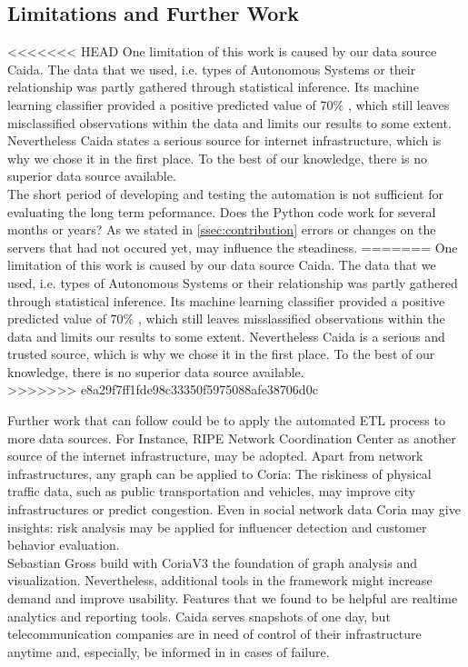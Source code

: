 \documentclass[conference, 11pt]{IEEEtran}
\begin{document}
\subsection{Limitations and Further Work}
<<<<<<< HEAD
One limitation of this work is caused by our data source Caida. The data that we used, i.e. types of Autonomous Systems or their relationship was partly gathered through statistical inference. Its machine learning classifier provided a positive predicted value of 70\% \cite{Classification}, which still leaves misclassified observations within the data and limits our results to some extent. Nevertheless Caida states a serious source for internet infrastructure, which is why we chose it in the first place. To the best of our knowledge, there is no superior data source available.  \\ 
The short period of developing and testing the automation is not sufficient for evaluating the long term peformance. Does the Python code work for several months or years? As we stated in \ref{ssec:contribution} errors or changes on the servers that had not occured yet, may influence the steadiness.
=======
One limitation of this work is caused by our data source Caida. The data that we used, i.e. types of Autonomous Systems or their relationship was partly gathered through statistical inference. Its machine learning classifier provided a positive predicted value of 70\% \cite{Classification} \cite{dataInference}, which still leaves misslassified observations within the data and limits our results to some extent. Nevertheless Caida is a serious and trusted source, which is why we chose it in the first place. To the best of our knowledge, there is no superior data source available.  \\ 
>>>>>>> e8a29f7ff1fde98c33350f5975088afe38706d0c

Further work that can follow could be to apply the automated ETL process to more data sources. For Instance, RIPE Network Coordination Center \cite{RipeNCC} as another source of the internet infrastructure, may be adopted. Apart from network infrastructures, any graph can be applied to Coria: The riskiness of physical traffic data, such as public transportation and vehicles, may improve city infrastructures or predict congestion. Even in social network data Coria may give insights: risk analysis may be applied for influencer detection and customer behavior evaluation.\\

Sebastian Gross build with CoriaV3 the foundation of graph analysis and visualization. Nevertheless, additional tools in the framework might increase demand and improve usability. Features that we found to be helpful are realtime analytics and reporting tools. Caida serves snapshots of one day, but telecommunication companies are in need of control of their infrastructure anytime and, especially, be informed in in cases of failure.
\end{document}
